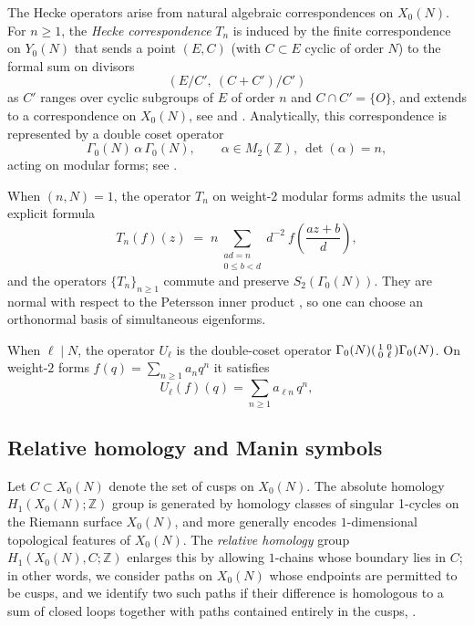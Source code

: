 \documentclass[10pt]{amsart}
\theoremstyle{theostyle}
\newcommand{\ZZ}{\mathbb{Z}}
\begin{document}
The Hecke operators arise from natural algebraic correspondences on $X_0(N)$.
For $n\ge 1$, the \emph{Hecke correspondence} $T_n$ is induced by the finite
correspondence on $Y_0(N)$ that sends a point $(E,C)$ (with $C\subset E$ cyclic
of order $N$) to the formal sum on divisors
$$(E/C',\ (C+C')/C')$$
as $C'$ ranges over cyclic subgroups of $E$ of order $n$ and $C\cap C'=\{O\}$,
and extends to a correspondence on $X_0(N)$, see \cite[\S 1.3]{Darmon:Fermat} and \cite[\S 5.3]{DiamonShurman:ModulaFroms}.
Analytically, this correspondence is represented by a double coset operator
\[
\Gamma_0(N)\,\alpha\,\Gamma_0(N),
\qquad \alpha\in M_2(\ZZ),\ \det(\alpha)=n,
\]
acting on modular forms; see \cite[\S 5.1]{DiamonShurman:ModulaFroms}.

When $(n,N)=1$, the operator $T_n$ on weight-$2$ modular forms admits the usual
explicit formula \cite[\S 6.2]{Iwaniec:Forms}
\[
T_n(f)(z) \;=\; n\!\!\!\sum_{\substack{ad=n\\0\le b<d}}\!\!\! d^{-2}\:
f\!\left(\frac{az+b}{d}\right),
\]
and the operators $\{T_n\}_{n\ge 1}$ commute and preserve $S_2(\Gamma_0(N))$.
They are normal with respect to the Petersson inner product \cite[\S 5.5]{DiamonShurman:ModulaFroms}, so one can choose
an orthonormal basis of simultaneous eigenforms.

When $\ell\mid N$, the operator $U_\ell$ is the double-coset operator
$\Gamma_0(N)\begin{psmallmatrix}1&0\\0&\ell\end{psmallmatrix}\Gamma_0(N)$.
On weight-$2$ forms $f(q)=\sum_{n\ge1}a_n q^n$ it satisfies
\[
U_\ell (f)(q)=\sum_{n\ge1} a_{\ell n}\,q^n,
\]

\subsection{Relative homology and Manin symbols}\label{sec:ManinSymbols}
Let $C\subset X_0(N)$ denote the set of cusps on $X_0(N)$. The absolute homology $H_1(X_0(N);\ZZ)$ group is generated by homology
classes of singular 1-cycles on the Riemann surface $X_0(N)$, and more generally
encodes $1$-dimensional topological features of $X_0(N)$.  The \emph{relative homology} group $H_1(X_0(N),C;\ZZ)$
enlarges this by allowing $1$-chains whose boundary lies in $C$; in other
words, we consider paths on $X_0(N)$ whose endpoints are permitted to be
cusps, and we identify two such paths if their difference is homologous to a
sum of closed loops together with paths contained entirely in the cusps, \cite[3.2]{Stein:ModularForms}.
\end{document}
